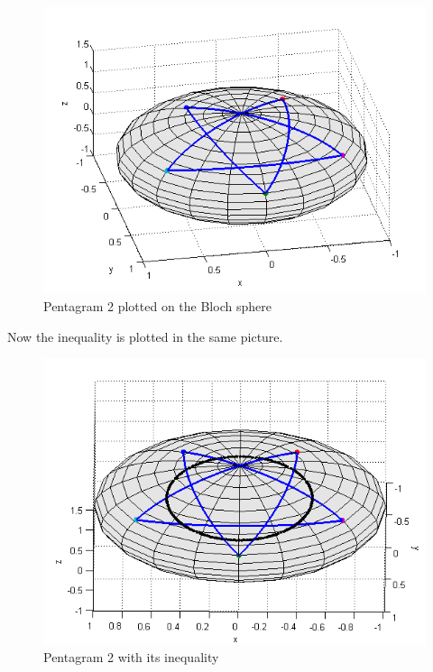 \begin{figure}[H]
\begin{center}
\includegraphics[scale=0.6]{penta2.png}
\caption{Pentagram 2 plotted on the Bloch sphere}
\label{fig:penta2}
\end{center}
\end{figure}
Now the inequality is plotted in the same picture.
\begin{figure}[H]
\begin{center}
\includegraphics[scale=0.6]{sphere2ine.png}
\caption{Pentagram 2 with its inequality}
\end{center}
\end{figure}

